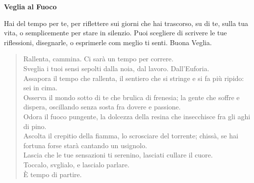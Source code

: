 \documentclass[17pt]{extletter}
\begin{document}
\hspace{4in}
\begin{center}
{\huge\bfseries
Veglia al Fuoco}
\end{center}


Hai del tempo per te, per riflettere sui giorni che hai trascorso, su di te, sulla tua vita, o semplicemente per stare in silenzio. Puoi scegliere di scrivere le tue riflessioni, disegnarle, o esprimerle com meglio ti senti.  
Buona Veglia.


\begin{quote}
Rallenta, cammina. Ci sarà un tempo per correre.\\
Sveglia i tuoi sensi sepolti dalla noia, dal lavoro. Dall'Euforia.\\
Assapora il tempo che rallenta, il sentiero che si stringe e si fa più ripido: sei in cima.\\
Osserva il mondo sotto di te che brulica di frenesia; la gente che soffre e dispera, oscillando senza sosta fra dovere e passione.\\
Odora il fuoco pungente, la dolcezza della resina che insecchisce fra gli aghi di pino.\\
Ascolta il crepitio della fiamma, lo scrosciare del torrente; chissà, se hai fortuna forse starà cantando un usignolo.\\
Lascia che le tue sensazioni ti serenino, lasciati cullare il cuore.\\
Toccalo, svglialo, e lascialo parlare.\\
È tempo di partire.\\
\end{quote}
\end{document}
